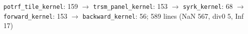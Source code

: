 \texttt{potrf\_tile\_kernel}: 159 $\to$ \texttt{trsm\_panel\_kernel}: 153 $\to$ \texttt{syrk\_kernel}: 68 $\to$ \texttt{forward\_kernel}: 153 $\to$ \texttt{backward\_kernel}: 56; 589 lines (NaN 567, div0 5, Inf 17)
